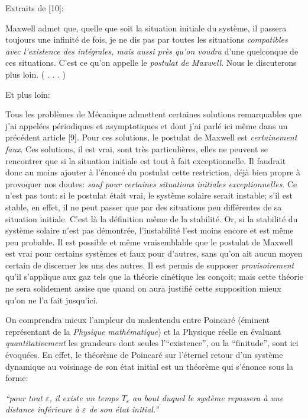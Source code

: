 Extraits de [10]:  
\medskip
{\cit  Maxwell admet que, quelle que soit la situation initiale du syst\`eme,
il passera toujours une infinit\'e de fois, je ne dis pas par toutes les 
situations {\it compatibles avec l'existence des int\'egrales, mais aussi 
pr\`es qu'on voudra} d'une quelconque de ces situations. 
\smallskip
C'est ce qu'on appelle le {\it postulat de Maxwell}. Nous le discuterons 
plus loin. ( . . .  ) \par  }
\medskip
Et plus loin: 
\medskip
{\cit  Tous les probl\`emes de M\'ecanique admettent certaines solutions
remarquables que j'ai appel\'ees p\'eriodiques et asymptotiques et dont 
j'ai parl\'e ici m\^eme dans un pr\'ec\'edent article [9]. 
\smallskip
Pour ces solutions, le postulat de Maxwell est {\it certainement faux}. 
\smallskip
Ces solutions, il est vrai, sont tr\`es particuli\`eres, elles ne peuvent se 
rencontrer que si la situation initiale est tout \`a fait exceptionnelle.
\smallskip
Il faudrait donc au moins ajouter \`a l'\'enonc\'e du postulat cette 
restriction, d\'ej\`a bien propre \`a provoquer nos doutes: {\it sauf pour 
certaines situations initiales exceptionnelles}. 
\smallskip
Ce n'est pas tout: si le postulat \'etait vrai, le syst\`eme solaire 
serait instable; s'il est stable, en effet, il ne peut passer que par 
des situations peu diff\'erentes de sa situation initiale. C'est l\`a 
la d\'efinition m\^eme de la stabilit\'e. 
\smallskip
Or, si la stabilit\'e du syst\`eme solaire n'est pas d\'emontr\'ee, 
l'instabilit\'e l'est moins encore et est m\^eme peu probable. 
\smallskip
Il est possible et m\^eme vraisemblable que le postulat de Maxwell est 
vrai pour certains syst\`emes et faux pour d'autres, sans qu'on ait aucun 
moyen certain de discerner les uns des autres. 
\smallskip
Il est permis de supposer {\it provisoirement} qu'il s'applique aux gaz 
tels que la th\'eorie cin\'etique les con\c{c}oit; mais cette th\'eorie 
ne sera solidement assise que quand on aura justifi\'e cette supposition 
mieux qu'on ne l'a fait jusqu'ici. \par }
\smallskip
On comprendra mieux l'ampleur du malentendu entre Poincar\'e (\'eminent 
repr\'esentant de la {\it Physique math\'ematique}) et la Physique 
r\'eelle en \'evaluant {\it quantitativement} les grandeurs dont seules 
l'``{existence}'', ou la ``{finitude}'', sont ici \'evoqu\'ees.
En effet, le th\'eor\`eme de Poincar\'e sur l'\'eternel retour d'un 
syst\`eme dynamique au voisinage de son \'etat initial est un th\'eor\`eme 
qui s'\'enonce sous la forme:
\smallskip
{\sl  ``pour tout $\varepsilon$, il existe un temps $T_{\varepsilon}$ au
bout duquel le syst\`eme repassera \`a une distance inf\'erieure \`a 
$\varepsilon$ de son \'etat initial.'' \par }
